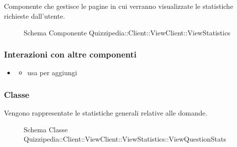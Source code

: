 \subsection{}
Componente che gestisce le pagine in cui verranno visualizzate le statistiche richieste dall'utente.
\begin{figure}[H]
\centering
\noindent{}
\caption[Schema Componente Quizzipedia::Client::ViewClient::ViewStatistics]{Schema Componente Quizzipedia::Client::ViewClient::ViewStatistics}
\end{figure}
\subsubsection{Interazioni con altre componenti}
\begin{itemize}
\item {}
\begin{itemize}
\item usa  per aggiungi
\end{itemize}
\end{itemize}
\subsubsection{Classe }
Vengono rappresentate le statistiche generali relative alle domande.
\begin{figure}[H]
\centering
\noindent{}
\caption[Schema Classe ViewQuestionStats]{Schema Classe Quizzipedia::Client::ViewClient::ViewStatistics::ViewQuestionStats}
\end{figure}
